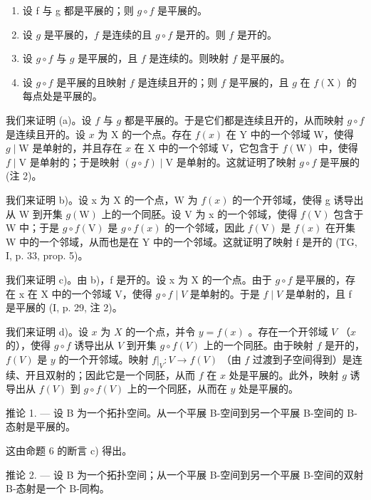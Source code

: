 \begin{enumerate}
\def\labelenumi{\alph{enumi})}
\item
  设 f 与 g 都是平展的；则 \(g \circ f\) 是平展的。
\item
  设 \(g\) 是平展的，\(f\) 是连续的且 \(g \circ f\) 是开的。则 \(f\) 是开的。
\item
  设 \(g \circ f\) 与 \(g\) 是平展的，且 \(f\) 是连续的。则映射 \(f\) 是平展的。
\item
  设 \(g \circ f\) 是平展的且映射 \(f\) 是连续且开的；则 \(f\) 是平展的，且 \(g\) 在 \(f(\mathrm{X})\) 的每点处是平展的。
\end{enumerate}

我们来证明 (a)。设 \(f\) 与 \(g\) 都是平展的。于是它们都是连续且开的，从而映射 \(g \circ f\) 是连续且开的。设 \(x\) 为 X 的一个点。存在 \(f(x)\) 在 Y 中的一个邻域 W，使得 \(g \mid \mathrm{W}\) 是单射的，并且存在 \(x\) 在 X 中的一个邻域 V，它包含于 \(f(\mathrm{W})\) 中，使得 \(f \mid \mathrm{V}\) 是单射的；于是映射 \((g \circ f) \mid \mathrm{V}\) 是单射的。这就证明了映射 \(g \circ f\) 是平展的 (注 2)。

我们来证明 b)。设 x 为 X 的一个点，W 为 \(f(x)\) 的一个开邻域，使得 g 诱导出从 W 到开集 \(g(\mathrm{W})\) 上的一个同胚。设 V 为 x 的一个邻域，使得 \(f(\mathrm{V})\) 包含于 W 中；于是 \(g \circ f(\mathrm{V})\) 是 \(g \circ f(x)\) 的一个邻域，因此 \(f(\mathrm{V})\) 是 \(f(x)\) 在开集 W 中的一个邻域，从而也是在 Y 中的一个邻域。这就证明了映射 f 是开的 (TG, I, p. 33, prop. 5)。

我们来证明 c)。由 b)，f 是开的。设 x 为 X 的一个点。由于 \(g \circ f\) 是平展的，存在 x 在 X 中的一个邻域 V，使得 \(g \circ f \mid V\) 是单射的。于是 \(f \mid V\) 是单射的，且 f 是平展的 (I, p. 29, 注 2)。

我们来证明 d)。设 \(x\) 为 \(X\) 的一个点，并令 \(y = f(x)\) 。存在一个开邻域 \(V\) （\(x\) 的），使得 \(g \circ f\) 诱导出从 \(V\) 到开集 \(g \circ f(V)\) 上的一个同胚。由于映射 \(f\) 是开的，\(f(V)\) 是 \(y\) 的一个开邻域。映射 \(f|_V\colon V \to f(V)\) （由 \(f\) 过渡到子空间得到）是连续、开且双射的；因此它是一个同胚，从而 \(f\) 在 \(x\) 处是平展的。此外，映射 \(g\) 诱导出从 \(f(V)\) 到 \(g \circ f(V)\) 上的一个同胚，从而在 \(y\) 处是平展的。

推论 1. — 设 B 为一个拓扑空间。从一个平展 B-空间到另一个平展 B-空间的 B-态射是平展的。

这由命题 6 的断言 c) 得出。

推论 2. --- 设 B 为一个拓扑空间；从一个平展 B-空间到另一个平展 B-空间的双射 B-态射是一个 B-同构。

